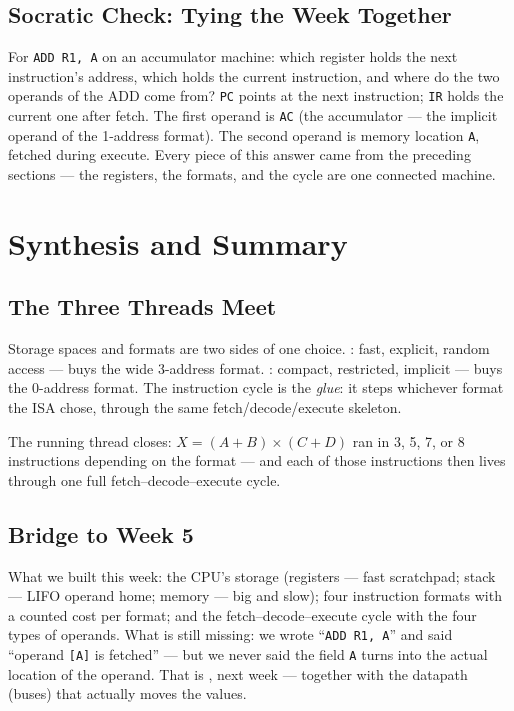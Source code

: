 \documentclass[11pt]{article}
\begin{document}
\subsection{Socratic Check: Tying the Week Together}

For \texttt{ADD R1, A} on an accumulator machine: which register holds the next instruction's address, which holds the current instruction, and where do the two operands of the ADD come from? \texttt{PC} points at the next instruction; \texttt{IR} holds the current one after fetch. The first operand is \texttt{AC} (the accumulator --- the implicit operand of the 1-address format). The second operand is memory location \texttt{A}, fetched during execute. Every piece of this answer came from the preceding sections --- the registers, the formats, and the cycle are one connected machine.

\section{Synthesis and Summary}
\label{sec:synthesis}

\subsection{The Three Threads Meet}

Storage spaces and formats are two sides of one choice. : fast, explicit, random access --- buys the wide 3-address format. : compact, restricted, implicit --- buys the 0-address format. The instruction cycle is the \emph{glue}: it steps whichever format the ISA chose, through the same fetch/decode/execute skeleton.

The running thread closes: $X = (A+B)\times(C+D)$ ran in 3, 5, 7, or 8 instructions depending on the format --- and each of those instructions then lives through one full fetch--decode--execute cycle.

\subsection{Bridge to Week 5}

What we built this week: the CPU's storage (registers --- fast scratchpad; stack --- LIFO operand home; memory --- big and slow); four instruction formats with a counted cost per format; and the fetch--decode--execute cycle with the four types of operands. What is still missing: we wrote ``\texttt{ADD R1, A}'' and said ``operand \texttt{[A]} is fetched'' --- but we never said  the field \texttt{A} turns into the actual location of the operand. That is , next week --- together with the datapath (buses) that actually moves the values.
\end{document}
